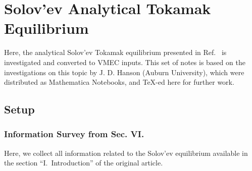 \chapter{Solov'ev Analytical Tokamak Equilibrium}
Here, the analytical Solov'ev Tokamak equilibrium
presented in Ref.~\cite{hirshman_whitson_1983}
is investigated and converted to VMEC inputs.
%
This set of notes is based on the investigations
on this topic by J. D. Hanson (Auburn University),
which were distributed as Mathematica Notebooks,
and TeX-ed here for further work.

\section{Setup}

\subsection{Information Survey from Sec. VI.}
Here, we collect all information
related to the Solov'ev equilibrium
available in the section ``I.~Introduction''
of the original article.

